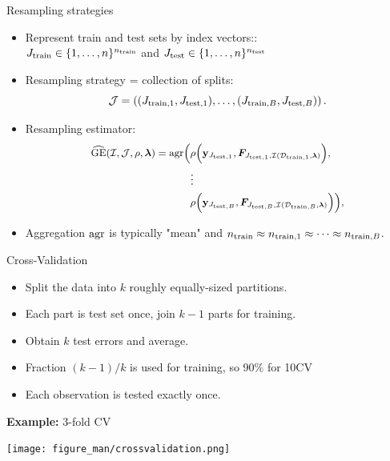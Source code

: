 \documentclass[11pt,compress,t,notes=noshow, xcolor=table]{beamer}
\begin{document}

\begin{vbframe}{Resampling strategies}
\footnotesize
\begin{itemize}
  \item Represent train and test sets by index
  vectors::\\ 
  $\Jtrain \in \nset^{\ntrain}$ and $\Jtest
  \in \nset^{\ntest}$
  \item Resampling strategy = collection of splits:
  $$\JJ = \JJset.$$
  \item Resampling estimator:  
\begin{equation*}
\small
\begin{split}
\GEhresa = \agr\Big(
 &\rho\Big(\yv_{\Jtesti[1]}, \FJtestftraini[1]\Big), \\ &\large{\vdots} \\
& \rho\Big(\yv_{\Jtesti[B]}, \FJtestftraini[B]\Big)
    \Big),
\end{split}
\end{equation*}
\item Aggregation $\agr$ is typically "mean" and $\ntrain \approx \ntraini[1] \approx \dots \approx \ntraini[B]$.
\end{itemize}

\end{vbframe}


\begin{vbframe}{Cross-Validation}

\begin{itemize}
  \item Split the data into $k$ roughly equally-sized partitions.
  \item Each part is test set once, join $k-1$ parts for training.
  \item Obtain $k$ test errors and average.
  \item Fraction $(k-1)/k$ is used for training, so 90\% for 10CV
  \item Each observation is tested exactly once.
\end{itemize}

\lz

\textbf{Example:} 3-fold CV

\begin{center}
\texttt{[image: figure\_man/crossvalidation.png]}
\end{center}
\end{vbframe}
\end{document}
